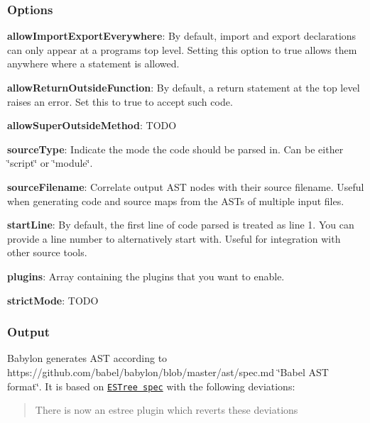 \subsubsection*{Options}


\begin{DoxyItemize}
\item {\bfseries allow\+Import\+Export\+Everywhere}\+: By default, {\ttfamily import} and {\ttfamily export} declarations can only appear at a program\textquotesingle{}s top level. Setting this option to {\ttfamily true} allows them anywhere where a statement is allowed.
\item {\bfseries allow\+Return\+Outside\+Function}\+: By default, a return statement at the top level raises an error. Set this to {\ttfamily true} to accept such code.
\item {\bfseries allow\+Super\+Outside\+Method}\+: T\+O\+DO
\item {\bfseries source\+Type}\+: Indicate the mode the code should be parsed in. Can be either {\ttfamily \char`\"{}script\char`\"{}} or {\ttfamily \char`\"{}module\char`\"{}}.
\item {\bfseries source\+Filename}\+: Correlate output A\+ST nodes with their source filename. Useful when generating code and source maps from the A\+S\+Ts of multiple input files.
\item {\bfseries start\+Line}\+: By default, the first line of code parsed is treated as line 1. You can provide a line number to alternatively start with. Useful for integration with other source tools.
\item {\bfseries plugins}\+: Array containing the plugins that you want to enable.
\item {\bfseries strict\+Mode}\+: T\+O\+DO
\end{DoxyItemize}

\subsubsection*{Output}

Babylon generates A\+ST according to https\+://github.com/babel/babylon/blob/master/ast/spec.\+md \char`\"{}\+Babel A\+S\+T format\char`\"{}. It is based on \href{https://github.com/estree/estree}{\tt E\+S\+Tree spec} with the following deviations\+:

\begin{quote}
There is now an {\ttfamily estree} plugin which reverts these deviations \end{quote}




